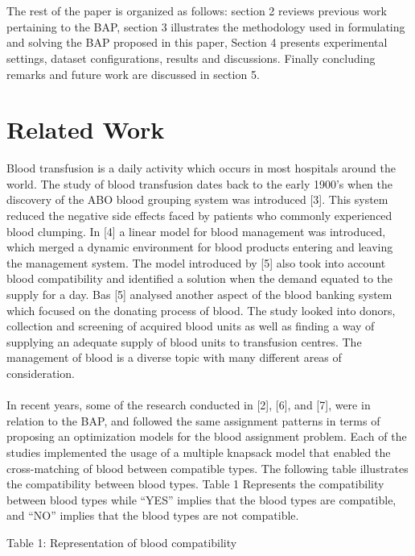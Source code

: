 \documentclass{article}
\begin{document}
\\
\\
The rest of the paper is organized as follows: section 2 reviews previous work pertaining to the BAP, section 3 illustrates the methodology used in formulating and solving the BAP proposed in this paper, Section 4 presents experimental settings, dataset configurations, results and discussions. Finally concluding remarks and future work are discussed in section 5.


\section{Related Work}
Blood transfusion is a daily activity which occurs in most hospitals around the world. The study of blood transfusion dates back to the early 1900’s when the discovery of the ABO blood grouping system was introduced [3]. This system reduced the negative side effects faced by patients who commonly experienced blood clumping.  In [4] a linear model for blood management was introduced, which merged a dynamic environment for blood products entering and leaving the management system. The model introduced by [5] also took into account blood compatibility and identified a solution when the demand equated to the supply for a day. Bas [5] analysed another aspect of the blood banking system which focused on the donating process of blood. The study looked into donors, collection and screening of acquired blood units as well as finding a way of supplying an adequate supply of blood units to transfusion centres. The management of blood is a diverse topic with many different areas of consideration.
\\
\\
In recent years, some of the research conducted in [2], [6], and [7], were in relation to the BAP, and followed the same assignment patterns in terms of proposing an optimization models for the blood assignment problem. Each of the studies implemented the usage of a multiple knapsack model that enabled the cross-matching of blood between compatible types. The following table illustrates the compatibility between blood types. Table 1 Represents the compatibility between blood types while “YES” implies that the blood types are compatible, and “NO” implies that the blood types are not compatible.
\begin {center}
Table 1: {Representation of blood compatibility }
\break
\end {center}
\end{document}
